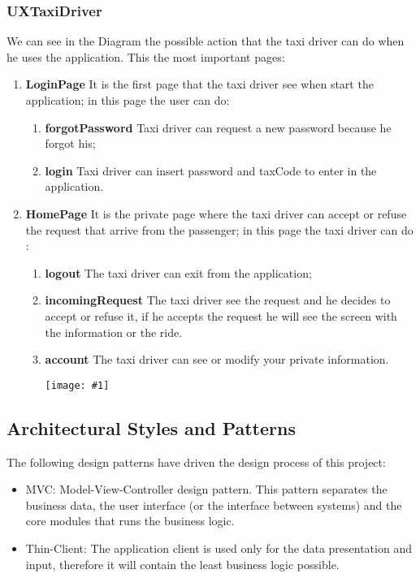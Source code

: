\documentclass[11pt, a4paper,titlepage]{article}
\newcommand{\image}[1]{
	\begin{center}
		\noindent \texttt{[image: \#1]}
	\end{center}
	}
\begin{document}
	\subsubsection{UXTaxiDriver}
	We can see in the Diagram the possible action that the taxi driver can do when he uses the application.
	This the most important pages:
	\begin{enumerate}
		\item \textbf{LoginPage} It is the first page that the taxi driver see when start the
		application; in this page the user can do:
		\begin{enumerate}
			
			\item \textbf{forgotPassword} Taxi driver can request a new password because he
			forgot his;
			\item \textbf{login} Taxi driver can insert password and taxCode to enter in the
			application.
		\end{enumerate}
		\item \textbf{HomePage} It is the private page where the taxi driver can accept or refuse the request that arrive from the passenger; in this page the taxi driver can do :
		\begin{enumerate}
			\item \textbf{logout} The taxi driver can exit from the application;
			\item \textbf{incomingRequest} The taxi driver see the request and he decides to accept
			or refuse it, if he accepts the request he will see the screen with the information or the ride.
			\item \textbf{account} The taxi driver can see or modify your private information.
			\image{ux_taxidriver.png}
		\end{enumerate}
	\end{enumerate}
	
\subsection{Architectural Styles and Patterns}
	The following design patterns have driven the design process of this project:
	\begin{itemize}
		\item MVC: Model-View-Controller design pattern. This pattern separates the business data, the user interface (or the interface between systems) and the core modules that runs the business logic. 
		\item Thin-Client: The application client is used only for the data presentation and input, therefore it will contain the least business logic possible.
	\end{itemize}
\end{document}
